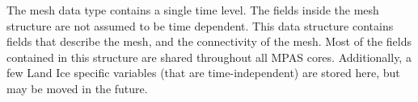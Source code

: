 The mesh data type contains a single time level. The fields inside the mesh
structure are not assumed to be time dependent. This data structure contains
fields that describe the mesh, and the connectivity of the mesh. Most of the
fields contained in this structure are shared throughout all MPAS cores.  
Additionally, a few Land Ice specific variables (that are time-independent)
are stored here, but may be moved in the future.
